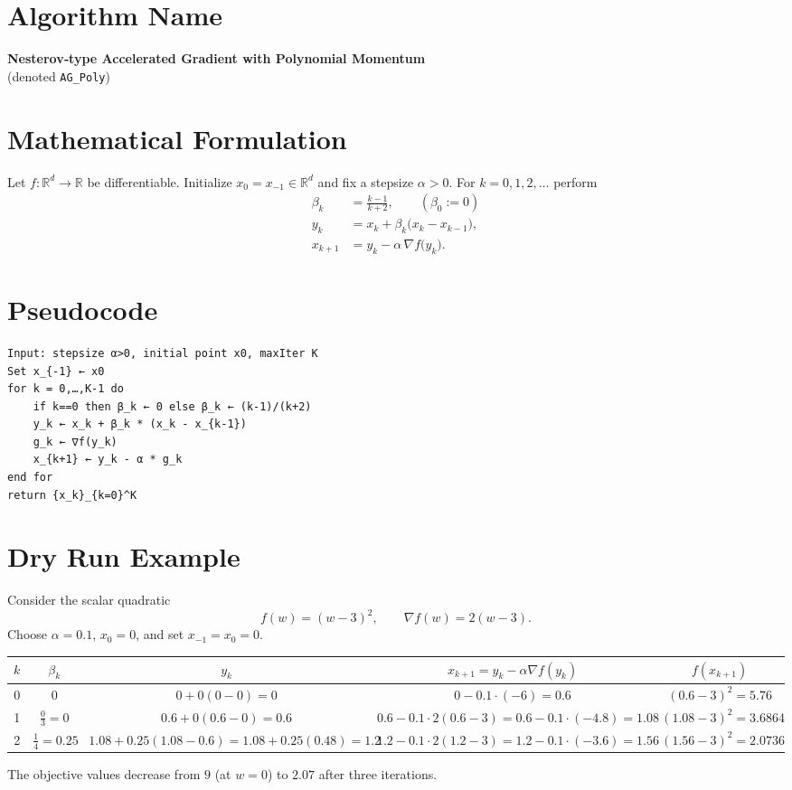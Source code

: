 \documentclass{article}
\begin{document}
\section*{Algorithm Name}
\textbf{Nesterov‑type Accelerated Gradient with Polynomial Momentum}\\
(denoted \texttt{AG\_Poly})

\section*{Mathematical Formulation}
Let $f:\mathbb{R}^{d}\rightarrow\mathbb{R}$ be differentiable.  
Initialize $x_{0}=x_{-1}\in\mathbb{R}^{d}$ and fix a stepsize $\alpha>0$.  
For $k=0,1,2,\dots$ perform
\[
\begin{aligned}
\beta_{k}&=\frac{k-1}{k+2},\qquad (\beta_{0}:=0)\\[4pt]
y_{k}&=x_{k}+\beta_{k}\bigl(x_{k}-x_{k-1}\bigr),\\[4pt]
x_{k+1}&=y_{k}-\alpha\,\nabla f\!\bigl(y_{k}\bigr).
\end{aligned}
\tag{1}
\]

\section*{Pseudocode}
\begin{verbatim}
Input: stepsize α>0, initial point x0, maxIter K
Set x_{-1} ← x0
for k = 0,…,K-1 do
    if k==0 then β_k ← 0 else β_k ← (k-1)/(k+2)
    y_k ← x_k + β_k * (x_k - x_{k-1})
    g_k ← ∇f(y_k)
    x_{k+1} ← y_k - α * g_k
end for
return {x_k}_{k=0}^K
\end{verbatim}

\section*{Dry Run Example}
Consider the scalar quadratic 
\[
f(w)=(w-3)^{2},\qquad \nabla f(w)=2(w-3).
\]
Choose $\alpha=0.1$, $x_{0}=0$, and set $x_{-1}=x_{0}=0$.

\begin{center}
\begin{tabular}{c|c|c|c|c}
$k$ & $\beta_{k}$ & $y_{k}$ & $x_{k+1}=y_{k}-\alpha\nabla f(y_{k})$ & $f(x_{k+1})$\\\hline
0 & $0$ & $0+0(0-0)=0$ & $0-0.1\cdot(-6)=0.6$ & $(0.6-3)^{2}=5.76$\\
1 & $\frac{0}{3}=0$ & $0.6+0(0.6-0)=0.6$ & $0.6-0.1\cdot2(0.6-3)=0.6-0.1\cdot(-4.8)=1.08$ & $(1.08-3)^{2}=3.6864$\\
2 & $\frac{1}{4}=0.25$ & $1.08+0.25(1.08-0.6)=1.08+0.25(0.48)=1.2$ &
$1.2-0.1\cdot2(1.2-3)=1.2-0.1\cdot(-3.6)=1.56$ & $(1.56-3)^{2}=2.0736$
\end{tabular}
\end{center}
The objective values decrease from $9$ (at $w=0$) to $2.07$ after three iterations.
\end{document}
